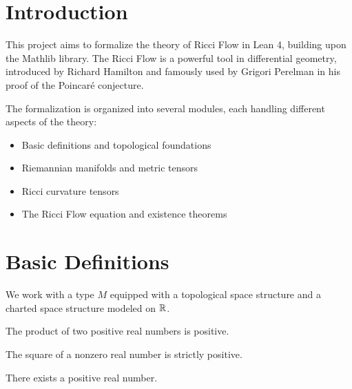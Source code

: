 
\chapter{Introduction}

This project aims to formalize the theory of Ricci Flow in Lean 4, building upon the Mathlib library. The Ricci Flow is a powerful tool in differential geometry, introduced by Richard Hamilton and famously used by Grigori Perelman in his proof of the Poincaré conjecture.

The formalization is organized into several modules, each handling different aspects of the theory:
\begin{itemize}
\item Basic definitions and topological foundations
\item Riemannian manifolds and metric tensors
\item Ricci curvature tensors
\item The Ricci Flow equation and existence theorems
\end{itemize}

\chapter{Basic Definitions}
\label{chap:basic}

\begin{definition}
\label{def:manifold-type}
\leanok
We work with a type $M$ equipped with a topological space structure and a charted space structure modeled on $\mathbb{R}$.
\end{definition}

\begin{lemma}
\label{lem:pos-mul-pos}
\leanok
{}
The product of two positive real numbers is positive.
\end{lemma}

\begin{lemma}
\label{lem:square-pos}
\leanok
The square of a nonzero real number is strictly positive.
\end{lemma}

\begin{lemma}
\label{lem:exists-pos-real}
\leanok
There exists a positive real number.
\end{lemma}

